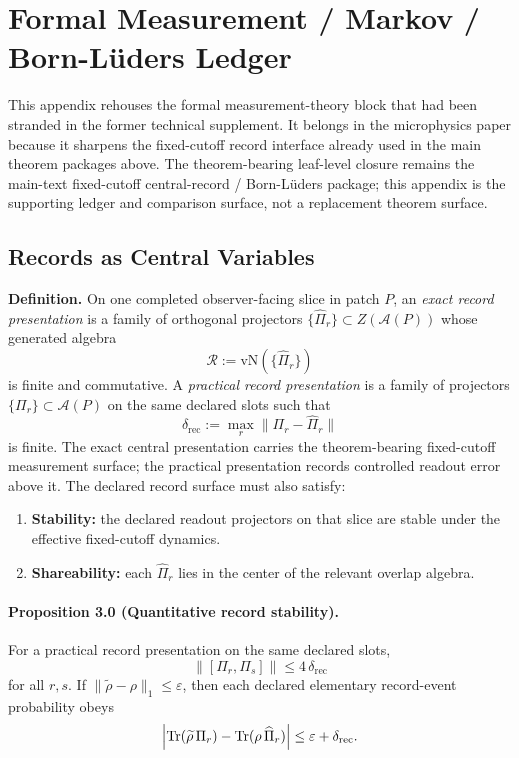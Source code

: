 \section{Formal Measurement / Markov / Born-L\"uders Ledger}
\label{app:microphysics-measurement-ledger}

This appendix rehouses the formal measurement-theory block that had been stranded in the former
technical supplement. It belongs in the microphysics paper because it sharpens the fixed-cutoff
record interface already used in the main theorem packages above. The theorem-bearing leaf-level
closure remains the main-text fixed-cutoff central-record / Born-L\"uders package; this appendix is
the supporting ledger and comparison surface, not a replacement theorem surface.

\subsection{Records as Central Variables}

\textbf{Definition.} On one completed observer-facing slice in patch \(P\), an \emph{exact record
presentation} is a family of orthogonal projectors
\(\{\widehat\Pi_r\}\subset Z(\mathcal A(P))\) whose generated algebra
\[
\mathcal R:=\mathrm{vN}(\{\widehat\Pi_r\})
\]
is finite and commutative. A \emph{practical record presentation} is a family of projectors
\(\{\Pi_r\}\subset\mathcal A(P)\) on the same declared slots such that
\[
\delta_{\mathrm{rec}}:=\max_r \|\Pi_r-\widehat\Pi_r\|
\]
is finite. The exact central presentation carries the theorem-bearing fixed-cutoff measurement
surface; the practical presentation records controlled readout error above it. The declared record
surface must also satisfy:
\begin{enumerate}[leftmargin=2em]
\item \textbf{Stability:} the declared readout projectors on that slice are stable under the effective fixed-cutoff dynamics.
\item \textbf{Shareability:} each \(\widehat\Pi_r\) lies in the center of the relevant overlap algebra.
\end{enumerate}

\paragraph{\textbf{Proposition 3.0 (Quantitative record stability).}}
For a practical record presentation on the same declared slots,
\[
\|[\Pi_r,\Pi_s]\|\le 4\,\delta_{\mathrm{rec}}
\]
for all \(r,s\). If \(\|\widetilde\rho-\rho\|_1\le\varepsilon\), then each declared elementary
record-event probability obeys
\[
\Bigl|
\operatorname{Tr}(\widetilde\rho\,\Pi_r)
-
\operatorname{Tr}(\rho\,\widehat\Pi_r)
\Bigr|
\le
\varepsilon+\delta_{\mathrm{rec}}.
\]

